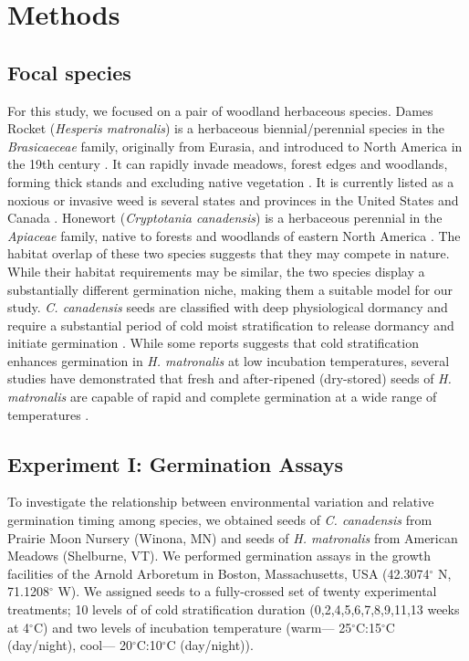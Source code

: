 \documentclass{article}[11pt]
\begin{document}
\section*{Methods}

\subsection*{Focal species}
 For this study, we focused on a pair of woodland herbaceous species. Dames Rocket (\textit{Hesperis matronalis}) is a herbaceous biennial/perennial species in the \textit{Brasicaeceae} family, originally from Eurasia, and introduced to North America in the 19th century \citep{Francis:2009wz}. It  can rapidly invade  meadows, forest edges and woodlands, forming thick stands and excluding native vegetation \citep{Francis:2009wz}. It is currently listed as a noxious or invasive weed is several states and provinces in the United States and Canada \citep{Susko:2008ut}. Honewort (\textit{Cryptotania canadensis}) is a herbaceous perennial in the \textit{Apiaceae} family, native to forests and woodlands of eastern North America \citep{Hawkins:2007vb}. The  habitat overlap of these two species suggests that they may compete in nature. While their habitat requirements may be similar, the two species display a substantially different germination niche, making them a suitable model for our study. \textit{C. canadensis} seeds are classified with deep physiological dormancy and require a substantial period of cold moist stratification to release dormancy and initiate germination \citep{Baskin:1988um}. While some reports suggests that cold stratification enhances germination in \textit{H. matronalis} at low incubation temperatures, several studies have demonstrated that fresh and after-ripened (dry-stored) seeds of \textit{H. matronalis} are capable of rapid and complete germination at a wide range of temperatures \citep{Susko:2008ut}. %

\subsection*{Experiment I: Germination Assays}
To investigate the relationship between environmental variation and relative germination timing among species, we obtained seeds of \textit{C. canadensis} from Prairie Moon Nursery (Winona, MN) and seeds of \textit{H. matronalis} from American Meadows (Shelburne, VT). %
We performed germination assays in the growth facilities of the Arnold Arboretum in Boston, Massachusetts, USA (42.3074$^{\circ}$ N, 71.1208$^{\circ}$ W). We assigned seeds to a fully-crossed set of twenty experimental treatments; 10 levels of of cold stratification duration (0,2,4,5,6,7,8,9,11,13 weeks at 4$^{\circ}$C) and two levels of incubation temperature (warm--- 25$^{\circ}$C:15$^{\circ}$C (day/night), cool--- 20$^{\circ}$C:10$^{\circ}$C (day/night)).
\end{document}
